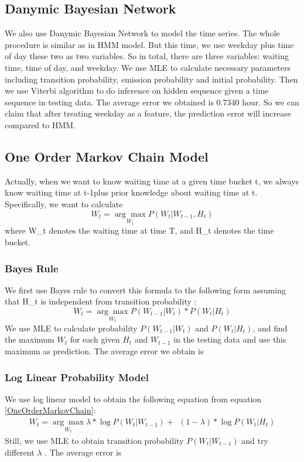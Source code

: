 \documentclass[10pt, conference, compsocconf]{IEEEtran}
\begin{document}
 \subsection{Danymic Bayesian Network}
We also use Danymic Bayesian Network to model the time series. The whole procedure is similar as in HMM model. But this time, we use weekday plus time of
day these two as two variables. So in total, there are three variables: waiting time, time of day, and weekday. We use MLE to
calculate necessary parameters including transition probability, emission probability and initial probability. Then we use Viterbi
algorithm to do inference on hidden sequence given a time sequence in testing data. The average error we obtained
is 0.7340 hour. So we can claim that after treating weekday as a feature, the prediction error will increase compared to HMM.

\subsection{One Order Markov Chain Model}
Actually, when we want to know waiting time at a given time bucket t, we always know waiting time at t-1plus prior knowledge about waiting
time at t.
Specifically, we want to calculate
\begin{equation}\label{OneOrderMarkovChain}
W_t=\underset{W_t}{\arg\max} {P(W_t|W_{t-1}, H_t)}
\end{equation}
where W\_t denotes the waiting time at time T, and H\_t denotes the time bucket. 

\subsubsection{Bayes Rule}
We first use Bayes rule to convert this formula to the following form assuming that H\_t is independent from transition probability :
\begin{equation}
W_t=\underset{W_t}{\arg\max} {P(W_{t-1}|W_t)*P(W_t|H_t)}
\end{equation}
We use MLE to calculate probability $P(W_{t-1}|W_t)$ and $P(W_t|H_t)$, and find the maximum $W_t$ for each given $H_t$
and $W_{t-1}$ in the testing data and use this maximum as prediction. The average error we obtain is 

\subsubsection{Log Linear Probability Model}
We use log linear model to obtain the following equation from equation \eqref{OneOrderMarkovChain}:
\begin{equation}
\begin{split}
W_t=\underset{W_t}{\arg\max}{\lambda*\log P(W_t|W_{t-1})+\ \
(1-\lambda)*\log P(W_t|H_t)}
\end{split}
\end{equation}
Still, we use MLE to obtain transition probability $P(W_t|W_{t-1})$ and try different $\lambda$ . The average error is 
\end{document}
